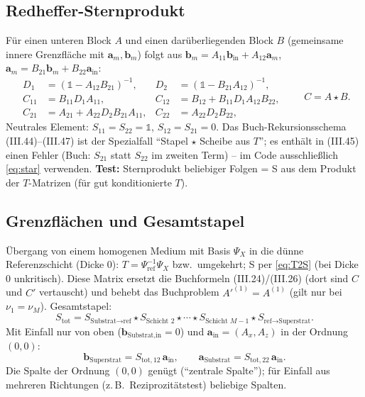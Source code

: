 \subsection{Redheffer-Sternprodukt}
Für einen unteren Block $A$ und einen darüberliegenden Block $B$ (gemeinsame innere Grenzfläche mit
$\mathbf a_m,\mathbf b_m$) folgt aus $\mathbf b_m=A_{11}\mathbf b_{\text{in}}+A_{12}\mathbf a_m$,
$\mathbf a_m=B_{21}\mathbf b_m+B_{22}\mathbf a_{\text{in}}$:
\begin{equation}
\begin{aligned}
  D_1&=(\mathbb 1-A_{12}B_{21})^{-1}, & D_2&=(\mathbb 1-B_{21}A_{12})^{-1},\\
  C_{11}&=B_{11}D_1A_{11}, & C_{12}&=B_{12}+B_{11}D_1A_{12}B_{22},\\
  C_{21}&=A_{21}+A_{22}D_2B_{21}A_{11}, & C_{22}&=A_{22}D_2B_{22},
\end{aligned}
\qquad C=A\star B .
\label{eq:star}
\end{equation}
Neutrales Element: $S_{11}=S_{22}=\mathbb 1$, $S_{12}=S_{21}=0$. Das Buch-Rekursionsschema
(III.44)--(III.47) ist der Spezialfall \enquote{Stapel $\star$ Scheibe aus $T$}; es enthält in (III.45) einen Fehler
(Buch: $S_{21}$ statt $S_{22}$ im zweiten Term) -- im Code ausschließlich \eqref{eq:star} verwenden.
\textbf{Test:} Sternprodukt beliebiger Folgen = S aus dem Produkt der $T$-Matrizen (für gut konditionierte $T$).

\subsection{Grenzflächen und Gesamtstapel}
Übergang von einem homogenen Medium mit Basis $\Psi_X$ in die dünne Referenzschicht (Dicke 0):
$T=\Psi_{\text{ref}}^{-1}\Psi_X$ bzw.\ umgekehrt; S per \eqref{eq:T2S} (bei Dicke 0 unkritisch).
Diese Matrix ersetzt die Buchformeln (III.24)/(III.26) (dort sind $C$ und $C'$ vertauscht) und behebt
das Buchproblem $A'^{(1)}=A^{(1)}$ (gilt nur bei $\nu_1=\nu_M$). Gesamtstapel:
\begin{equation}
  S_{\text{tot}}=S_{\text{Substrat}\to\text{ref}}\star S_{\text{Schicht }2}\star\cdots\star S_{\text{Schicht }M-1}\star S_{\text{ref}\to\text{Superstrat}} .
  \label{eq:Stot}
\end{equation}
Mit Einfall nur von oben ($\mathbf b_{\text{Substrat,in}}=0$) und $\mathbf a_{\text{in}}=(A_x,A_z)$ in der Ordnung $(0,0)$:
\begin{equation}
  \mathbf b_{\text{Superstrat}}=S_{\text{tot},12}\,\mathbf a_{\text{in}},\qquad
  \mathbf a_{\text{Substrat}}=S_{\text{tot},22}\,\mathbf a_{\text{in}} .
  \label{eq:solution}
\end{equation}
Die Spalte der Ordnung $(0,0)$ genügt (\enquote{zentrale Spalte}); für Einfall aus mehreren Richtungen
(z.\,B.\ Reziprozitätstest) beliebige Spalten.

